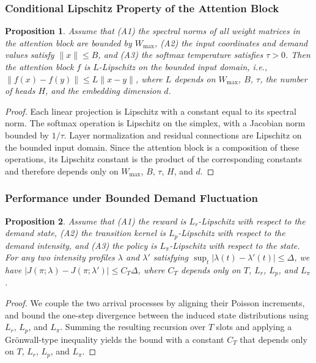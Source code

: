 \documentclass[lettersize,journal]{IEEEtran}
\newtheorem{proposition}{Proposition}
\begin{document}
\subsubsection{Conditional Lipschitz Property of the Attention Block}
\begin{proposition}
Assume that (A1) the spectral norms of all weight matrices in the attention block are bounded by $W_{\max}$, (A2) the input coordinates and demand values satisfy $\|x\| \le B$, and (A3) the softmax temperature satisfies $\tau > 0$. Then the attention block $f$ is $L$-Lipschitz on the bounded input domain, i.e., $\|f(x)-f(y)\| \le L\|x-y\|$, where $L$ depends on $W_{\max}$, $B$, $\tau$, the number of heads $H$, and the embedding dimension $d$.
\end{proposition}
\begin{proof}
Each linear projection is Lipschitz with a constant equal to its spectral norm. The softmax operation is Lipschitz on the simplex, with a Jacobian norm bounded by $1/\tau$. Layer normalization and residual connections are Lipschitz on the bounded input domain. Since the attention block is a composition of these operations, its Lipschitz constant is the product of the corresponding constants and therefore depends only on $W_{\max}$, $B$, $\tau$, $H$, and $d$.
\end{proof}

\subsubsection{Performance under Bounded Demand Fluctuation}
\begin{proposition}
Assume that (A1) the reward is $L_r$-Lipschitz with respect to the demand state, (A2) the transition kernel is $L_p$-Lipschitz with respect to the demand intensity, and (A3) the policy is $L_\pi$-Lipschitz with respect to the state. For any two intensity profiles $\lambda$ and $\lambda'$ satisfying $\sup_t |\lambda(t)-\lambda'(t)| \le \Delta$, we have $|J(\pi;\lambda)-J(\pi;\lambda')| \le C_T \Delta$, where $C_T$ depends only on $T$, $L_r$, $L_p$, and $L_\pi$.
\end{proposition}
\begin{proof}
We couple the two arrival processes by aligning their Poisson increments, and bound the one-step divergence between the induced state distributions using $L_r$, $L_p$, and $L_\pi$. Summing the resulting recursion over $T$ slots and applying a Gr\"onwall-type inequality yields the bound with a constant $C_T$ that depends only on $T$, $L_r$, $L_p$, and $L_\pi$.
\end{proof}
\end{document}
